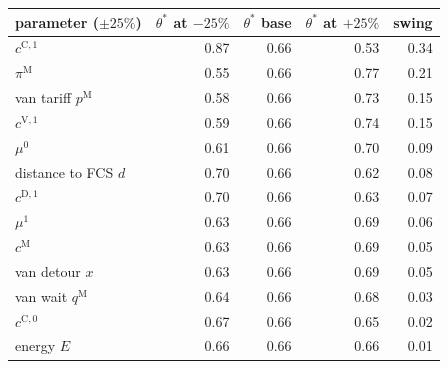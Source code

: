 \begin{tabular}{@{}lrrrr@{}}
\toprule
parameter ($\pm25\%$) & $\theta^{*}$ at $-25\%$ & $\theta^{*}$ base & $\theta^{*}$ at $+25\%$ & swing \\
\midrule
$c^{\mathrm{C},1}$ & 0.87 & 0.66 & 0.53 & 0.34 \\
$\pi^{\mathrm M}$ & 0.55 & 0.66 & 0.77 & 0.21 \\
van tariff $p^{\mathrm M}$ & 0.58 & 0.66 & 0.73 & 0.15 \\
$c^{\mathrm{V},1}$ & 0.59 & 0.66 & 0.74 & 0.15 \\
$\mu^{0}$ & 0.61 & 0.66 & 0.70 & 0.09 \\
distance to FCS $d$ & 0.70 & 0.66 & 0.62 & 0.08 \\
$c^{\mathrm{D},1}$ & 0.70 & 0.66 & 0.63 & 0.07 \\
$\mu^{1}$ & 0.63 & 0.66 & 0.69 & 0.06 \\
$c^{\mathrm M}$ & 0.63 & 0.66 & 0.69 & 0.05 \\
van detour $x$ & 0.63 & 0.66 & 0.69 & 0.05 \\
van wait $q^{\mathrm M}$ & 0.64 & 0.66 & 0.68 & 0.03 \\
$c^{\mathrm{C},0}$ & 0.67 & 0.66 & 0.65 & 0.02 \\
energy $E$ & 0.66 & 0.66 & 0.66 & 0.01 \\
\bottomrule
\end{tabular}
